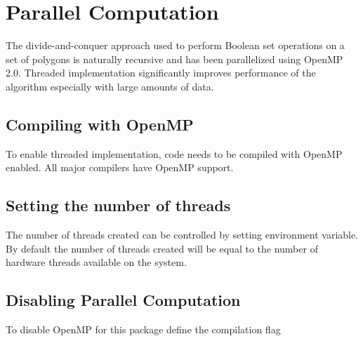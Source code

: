 \section{Parallel Computation\label{bso_sec:bso_par}}

The divide-and-conquer approach used to perform Boolean set operations on a set of polygons is naturally recursive and has been parallelized using OpenMP 2.0. Threaded implementation significantly improves performance of the algorithm especially with large amounts of data. 

\subsection{Compiling with OpenMP\label{bso_ssec:compiling_with_openmp}}

To enable threaded implementation, code needs to be compiled with OpenMP enabled. All major compilers have OpenMP support. 

\subsection{Setting the number of threads\label{bso_ssec:set_num_thread}}

The number of threads created can be controlled by setting  environment variable. By default the number of threads created will be equal to the number of hardware threads available on the system.

\subsection{Disabling Parallel Computation\label{bso_ssec:disable_parallel}}

To disable OpenMP for this package define the compilation flag 

